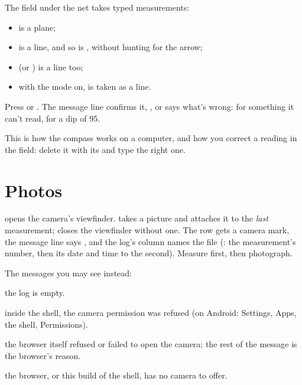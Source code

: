 The field under the net takes typed measurements:

\begin{itemize}
\item {} is a plane;
\item {} is a line, and so is , without hunting for the arrow;
\item {} (or ) is a line too;
\item with the  mode on,  is taken as a line.
\end{itemize}

Press  or . The message line confirms it, , or says what's wrong:
 for something it can't read, 
for a dip of 95.

This is how the compass works on a computer, and how you correct a reading in the field: delete it with
its  and type the right one.

\section{Photos}\label{sec:photos}


 opens the camera's viewfinder.  takes a picture and attaches it to the \emph{last}
measurement;  closes the viewfinder without one. The row gets a camera mark, the message line
says , and the log's  column names the file
(: the measurement's number, then its date and time to the second).
Measure first, then photograph.

The messages you may see instead:

\begin{description}[style=nextline]
\item[\ui{measure first — the photo attaches to the last measurement}] the log is empty.
\item[\ui{camera denied}] inside the shell, the camera permission was refused (on Android: Settings,
Apps, the shell, Permissions).
\item[\ui{camera: …}] the browser itself refused or failed to open the camera; the rest of the message is
the browser's reason.
\item[\ui{no camera API here} or \ui{no camera in this build}] the browser, or this build of the shell,
has no camera to offer.
\end{description}


